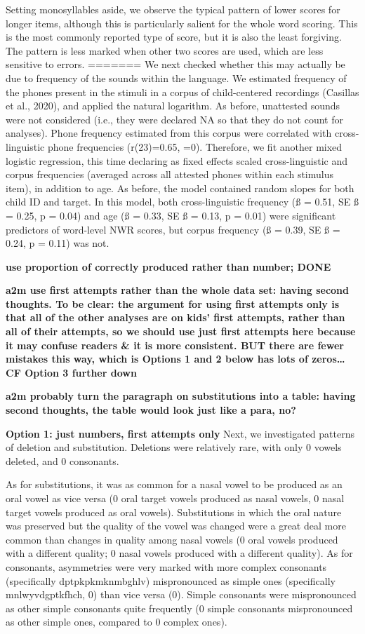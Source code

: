 \documentclass[english,,man,floatsintext]{apa6}
\begin{document}
Setting monosyllables aside, we observe the typical pattern of lower scores for longer items, although this is particularly salient for the whole word scoring. This is the most commonly reported type of score, but it is also the least forgiving. The pattern is less marked when other two scores are used, which are less sensitive to errors.
=======
We next checked whether this may actually be due to frequency of the
sounds within the language. We estimated frequency of the phones present
in the stimuli in a corpus of child-centered recordings (Casillas et
al., 2020), and applied the natural logarithm. As before, unattested
sounds were not considered (i.e., they were declared NA so that they do
not count for analyses). Phone frequency estimated from this corpus were
correlated with cross-linguistic phone frequencies (r(23)=0.65, =0).
Therefore, we fit another mixed logistic regression, this time declaring
as fixed effects scaled cross-linguistic and corpus frequencies
(averaged across all attested phones within each stimulus item), in
addition to age. As before, the model contained random slopes for both
child ID and target. In this model, both cross-linguistic frequency (ß =
0.51, SE ß = 0.25, p = 0.04) and age (ß = 0.33, SE ß = 0.13, p = 0.01)
were significant predictors of word-level NWR scores, but corpus
frequency (ß = 0.39, SE ß = 0.24, p = 0.11) was not.

\textbf{use proportion of correctly produced rather than number; DONE}

\textbf{a2m use first attempts rather than the whole data set: having
second thoughts. To be clear: the argument for using first attempts only
is that all of the other analyses are on kids' first attempts, rather
than all of their attempts, so we should use just first attempts here
because it may confuse readers \& it is more consistent. BUT there are
fewer mistakes this way, which is Options 1 and 2 below has lots of
zeros\ldots{} CF Option 3 further down}

\textbf{a2m probably turn the paragraph on substitutions into a table:
having second thoughts, the table would look just like a para, no?}

\textbf{Option 1: just numbers, first attempts only } Next, we
investigated patterns of deletion and substitution. Deletions were
relatively rare, with only 0 vowels deleted, and 0 consonants.

As for substitutions, it was as common for a nasal vowel to be produced
as an oral vowel as vice versa (0 oral target vowels produced as nasal
vowels, 0 nasal target vowels produced as oral vowels). Substitutions in
which the oral nature was preserved but the quality of the vowel was
changed were a great deal more common than changes in quality among
nasal vowels (0 oral vowels produced with a different quality; 0 nasal
vowels produced with a different quality). As for consonants,
asymmetries were very marked with more complex consonants (specifically
dptpkpkmknmbghlv) mispronounced as simple ones (specifically
mnlwyvdgptkfhch, 0) than vice versa (0). Simple consonants were
mispronounced as other simple consonants quite frequently (0 simple
consonants mispronounced as other simple ones, compared to 0 complex
ones).
\end{document}
